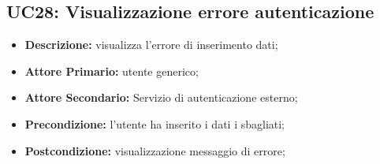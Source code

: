 \subsection{UC28: Visualizzazione errore autenticazione }
\label{sec:UC28}
\begin{itemize}
    \item \textbf{Descrizione:} visualizza l'errore di inserimento dati;
    \item \textbf{Attore Primario:} utente generico;
    \item \textbf{Attore Secondario:} Servizio di autenticazione esterno;
    \item \textbf{Precondizione:} l'utente ha inserito i dati i sbagliati;
    \item \textbf{Postcondizione:} visualizzazione messaggio di errore;
\end{itemize}